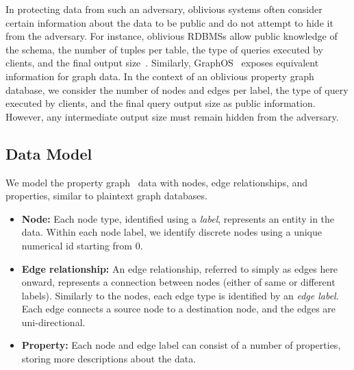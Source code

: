 In protecting data from such an adversary, oblivious systems often consider 
certain information about the data to be public and do not attempt to hide 
it from the adversary. For instance, oblivious RDBMSs allow public 
knowledge of the schema, the number of tuples per table, the type of 
queries executed by clients, and the final output 
size~\cite{mavrogiannakis2025obliviator, krastnikov2020efficient, popa2011cryptdb, eskandarian2019oblidb}. Similarly, 
GraphOS~\cite{chamani2023graphos} exposes equivalent information for graph data. In the context of an oblivious property graph database, we consider 
the number of nodes and edges per label, the type of query executed by 
clients, and the final query output size as public information. However, 
any intermediate output size must remain hidden from the adversary.


\subsection{Data Model}
\label{sub:data-model}
We model the property graph~\cite{robinson2015graph} data with nodes, edge
relationships, and properties, similar to plaintext graph databases.
\begin{itemize}[leftmargin=*]
    \item \textbf{Node:} Each node type, identified using a
    \textit{label}, represents an entity in the data. Within each node label, we identify discrete nodes using a unique numerical id starting from 0.
    \item \textbf{Edge relationship:} An edge relationship,
    referred to simply as edges here onward, represents a connection between nodes (either of same or different labels). Similarly to the nodes, each edge type is identified by
    an \textit{edge label}. 
    Each edge connects a source node to a destination node, and the edges are uni-directional. 
    \item \textbf{Property:} Each node and edge label can consist of a number of properties, storing more descriptions about the data.
\end{itemize}

